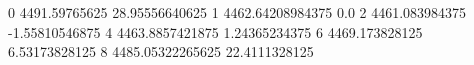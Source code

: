 0 4491.59765625 28.95556640625
1 4462.64208984375 0.0
2 4461.083984375 -1.55810546875
4 4463.8857421875 1.24365234375
6 4469.173828125 6.53173828125
8 4485.05322265625 22.4111328125
